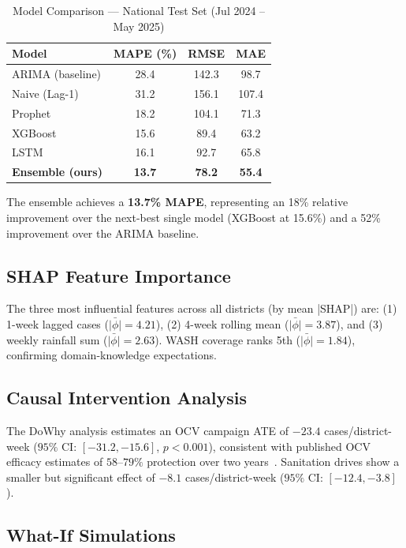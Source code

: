 \documentclass[conference]{IEEEtran}
\begin{document}
\begin{table}[H]
\caption{Model Comparison — National Test Set (Jul 2024 – May 2025)}
\label{tab:results}
\centering
\begin{tabular}{lccc}
\toprule
\textbf{Model} & \textbf{MAPE (\%)} & \textbf{RMSE} & \textbf{MAE} \\
\midrule
ARIMA (baseline)   & 28.4 & 142.3 &  98.7 \\
Naive (Lag-1)       & 31.2 & 156.1 & 107.4 \\
Prophet             & 18.2 & 104.1 &  71.3 \\
XGBoost             & 15.6 &  89.4 &  63.2 \\
LSTM                & 16.1 &  92.7 &  65.8 \\
\textbf{Ensemble (ours)} & \textbf{13.7} & \textbf{78.2} & \textbf{55.4} \\
\bottomrule
\end{tabular}
\end{table}

The ensemble achieves a \textbf{13.7\% MAPE}, representing an 18\% relative
improvement over the next-best single model (XGBoost at 15.6\%) and a 52\%
improvement over the ARIMA baseline.

\subsection{SHAP Feature Importance}

The three most influential features across all districts (by mean |SHAP|) are:
(1) 1-week lagged cases ($\bar{|\phi|} = 4.21$),
(2) 4-week rolling mean ($\bar{|\phi|} = 3.87$), and
(3) weekly rainfall sum ($\bar{|\phi|} = 2.63$).
WASH coverage ranks 5th ($\bar{|\phi|} = 1.84$), confirming domain-knowledge
expectations.

\subsection{Causal Intervention Analysis}

The DoWhy analysis estimates an OCV campaign ATE of
$-23.4$ cases/district-week ($95\%$ CI: $[-31.2, -15.6]$, $p<0.001$),
consistent with published OCV efficacy estimates of $58$--$79\%$ protection
over two years~\cite{who_ocv_2023}. Sanitation drives show a smaller but
significant effect of $-8.1$ cases/district-week ($95\%$ CI: $[-12.4, -3.8]$).

\subsection{What-If Simulations}
\end{document}
